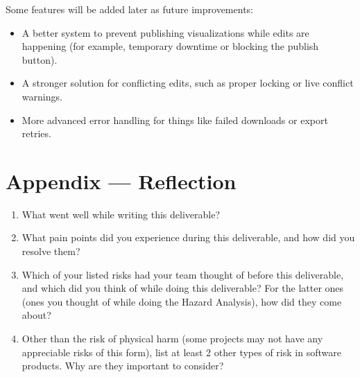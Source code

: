 \documentclass{article}
\begin{document}
Some features will be added later as future improvements:

\begin{itemize}
    \item A better system to prevent publishing visualizations while edits are happening (for example, temporary downtime or blocking the publish button).
    \item A stronger solution for conflicting edits, such as proper locking or live conflict warnings.
    \item More advanced error handling for things like failed downloads or export retries.
\end{itemize}


\newpage{}

\section*{Appendix --- Reflection}




\begin{enumerate}
    \item What went well while writing this deliverable? 
    \item What pain points did you experience during this deliverable, and how
    did you resolve them?
    \item Which of your listed risks had your team thought of before this
    deliverable, and which did you think of while doing this deliverable? For
    the latter ones (ones you thought of while doing the Hazard Analysis), how
    did they come about?
    \item Other than the risk of physical harm (some projects may not have any
    appreciable risks of this form), list at least 2 other types of risk in
    software products. Why are they important to consider?
\end{enumerate}
\end{document}

